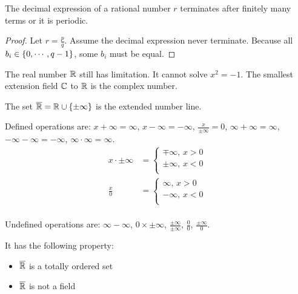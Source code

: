 \begin{theorem}
    The decimal expression of a rational number $r$ terminates after finitely many terms or it is periodic.    
\end{theorem}
\begin{proof}
    Let $r = \frac{p}{q}$. Assume the decimal expression never terminate. Because all $b_i \in \set{0, \cdots, q -1}$, some $b_i$ must be equal.
\end{proof}





The real number $\mathbb{R}$ still has limitation. It cannot solve $x^2 = -1$. The smallest extension field $\mathbb{C}$ to $\mathbb{R}$ is the complex number.


\begin{definition}
    The set $\overline{\mathbb{R}} = \mathbb{R} \cup \set{\pm \infty}$ is the extended number line. 
    
    Defined operations are: $x + \infty = \infty$, $x - \infty = -\infty$, $\displaystyle \frac{x}{\pm \infty} = 0$, $\infty + \infty = \infty$, $- \infty - \infty = - \infty$, $\infty \cdot \infty = \infty$.
    \begin{equation}
        \begin{aligned}
            x \cdot \pm \infty &= \begin{cases}
                \mp \infty \text{, } x > 0 \\
                \pm \infty \text{, } x < 0 \\
            \end{cases} \\
            \frac{x}{0} &= \begin{cases}
                \infty \text{, } x > 0 \\
                -\infty \text{, } x < 0 \\
            \end{cases} \\
        \end{aligned}
    \end{equation}
    
    Undefined operations are: $\infty - \infty$, $0 \times \pm \infty$, $\displaystyle \frac{\pm \infty}{\pm \infty}$, $\displaystyle \frac{0}{0}$, $\displaystyle \frac{\pm \infty}{0}$.
    
    It has the following property:
    \begin{itemize}
        \item $\overline{\mathbb{R}}$ is a totally ordered set
        \item $\overline{\mathbb{R}}$ is not a field
    \end{itemize}
\end{definition}

